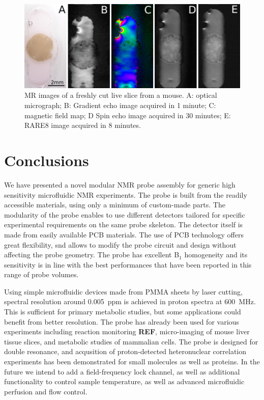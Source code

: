 \documentclass[preprint,12pt]{article}
\newcommand{\todo}[1]{{\color{red}\textbf{#1}}}
\begin{document}
\begin{figure}
\centering
\includegraphics[width=.7\linewidth,keepaspectratio=true]{./figures/ms5n17-tisli-im-180511.png} 
\caption{MR images of a freshly cut live slice from a mouse. A: optical micrograph; B: Gradient echo image acquired in 1 minute; C: magnetic field map; D Spin echo image acquired in 30 minutes; E: RARE8 image acquired in 8 minutes.}
\label{fig:tisli} 
\end{figure}


\section{Conclusions}
We have presented a novel modular NMR probe assembly for generic high 
sensitivity microfluidic NMR experiments. 
The probe is built from the readily accessible materials, using only a minimum
of custom-made parts. 
The modularity of the probe enables to use different detectors 
tailored for specific experimental requirements on the same probe skeleton. 
The detector itself is made from easily available PCB materials. 
The use of PCB technology offers great flexibility, snd allows to modify the 
probe circuit and design without affecting the probe geometry. 
The probe has excellent B$_1$ homogeneity and its sensitivity is in line with
the best performances that have been reported in this range of probe volumes.

Using simple microfluidic devices made from PMMA sheets by laser cutting,
spectral resolution around 0.005~ppm is achieved in proton spectra at 
600~MHz. This is sufficient for primary metabolic studies, but some
applications could benefit from better resolution. The probe has already been 
used for various  experiments including reaction monitoring  \todo{REF}, 
micro-imaging of mouse liver tissue slices, and metabolic studies of 
mammalian cells. The probe is designed for double resonance, and
acqusition of proton-detected heteronuclear correlation experiments
has been demonstrated for small molecules as well as proteins. 
In the future we intend to add a field-frequency lock channel,
as well as additional functionality to control sample temperature, 
as well as advanced microfluidic perfusion and flow control.
\end{document}
